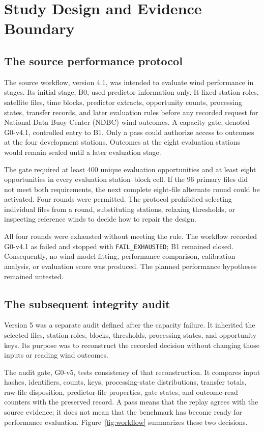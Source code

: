 \section{Study Design and Evidence Boundary}
\label{sec:identity}
\subsection{The source performance protocol}
The source workflow, version 4.1, was intended to evaluate wind performance in stages. Its initial stage, B0, used predictor information only. It fixed station roles, satellite files, time blocks, predictor extracts, opportunity counts, processing states, transfer records, and later evaluation rules before any recorded request for National Data Buoy Center (NDBC) wind outcomes. A capacity gate, denoted G0-v4.1, controlled entry to B1. Only a pass could authorize access to outcomes at the four development stations. Outcomes at the eight evaluation stations would remain sealed until a later evaluation stage.

The gate required at least 400 unique evaluation opportunities and at least eight opportunities in every evaluation station--block cell. If the 96 primary files did not meet both requirements, the next complete eight-file alternate round could be activated. Four rounds were permitted. The protocol prohibited selecting individual files from a round, substituting stations, relaxing thresholds, or inspecting reference winds to decide how to repair the design.

All four rounds were exhausted without meeting the rule. The workflow recorded G0-v4.1 as failed and stopped with \texttt{FAIL\_EXHAUSTED}; B1 remained closed. Consequently, no wind model fitting, performance comparison, calibration analysis, or evaluation score was produced. The planned performance hypotheses remained untested.

\subsection{The subsequent integrity audit}
Version 5 was a separate audit defined after the capacity failure. It inherited the selected files, station roles, blocks, thresholds, processing states, and opportunity keys. Its purpose was to reconstruct the recorded decision without changing those inputs or reading wind outcomes.

The audit gate, G0-v5, tests consistency of that reconstruction. It compares input hashes, identifiers, counts, keys, processing-state distributions, transfer totals, raw-file disposition, predictor-file properties, gate states, and outcome-read counters with the preserved record. A pass means that the replay agrees with the source evidence; it does not mean that the benchmark has become ready for performance evaluation. Figure~\ref{fig:workflow} summarizes these two decisions.

